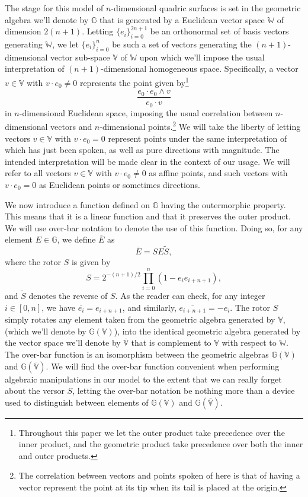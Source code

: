 \documentclass{birkjour}
\theoremstyle{definition}
\theoremstyle{remark}
\numberwithin{equation}{section}
\newcommand{\G}{\mathbb{G}}
\newcommand{\V}{\mathbb{V}}
\newcommand{\W}{\mathbb{W}}
\begin{document}
The stage for this model of $n$-dimensional quadric surfaces is set in the geometric
algebra we'll denote by $\G$ that is generated by a Euclidean vector space $\W$ of dimension
$2(n+1)$.  Letting $\{e_i\}_{i=0}^{2n+1}$ be an orthonormal set of basis vectors
generating $\W$, we let $\{e_i\}_{i=0}^n$ be such a set of vectors generating
the $(n+1)$-dimensional vector sub-space $\V$ of $\W$ upon which we'll impose the
usual interpretation of $(n+1)$-dimensional homogeneous space.  Specifically,
a vector $v\in\V$ with $v\cdot e_0\neq 0$ represents the point given by\footnote{Throughout this
paper we let the outer product take precedence over the inner product, and the geometric product
take precedence over both the inner and outer products.}
\begin{equation}
\frac{e_0\cdot e_0\wedge v}{e_0\cdot v}
\end{equation}
in $n$-dimensional Euclidean space, imposing the usual correlation between $n$-dimensional
vectors and $n$-dimensional points.\footnote{The correlation between
vectors and points spoken of here is that of having a vector represent the point
at its tip when its tail is placed at the origin.}  We will take the liberty of letting vectors $v\in\V$ with $v\cdot e_0=0$
represent points under the same interpretation of which has just been spoken, as
well as pure directions with magnitude.  The intended interpretation will be made clear
in the context of our usage.  We will refer to all vectors $v\in\V$ with $v\cdot e_0\neq 0$
as affine points, and such vectors with $v\cdot e_0=0$ as Euclidean points
or sometimes directions.

We now introduce a function defined on $\G$ having the outermorphic property.
This means that it is a linear function and that it preserves the outer product.  We will
use over-bar notation to denote the use of this function.  Doing so, for any
element $E\in\G$, we define $\overline{E}$ as
\begin{equation}
\overline{E} = SE\tilde{S},
\end{equation}
where the rotor $S$ is given by
\begin{equation}
S = 2^{-(n+1)/2}\prod_{i=0}^n\left(1-e_ie_{i+n+1}\right),
\end{equation}
and $\tilde{S}$ denotes the reverse of $S$.
As the reader can check, for any integer $i\in[0,n]$, we have $\overline{e_i}=e_{i+n+1}$,
and similarly, $\overline{e_{i+n+1}}=-e_i$.
The rotor $S$ simply rotates any element taken from the geometric algebra generated
by $\V$, (which we'll denote by $\G(\V)$), into the identical geometric
algebra generated by the vector
space we'll denote by $\overline{\V}$ that is complement to $\V$ with respect to $\W$.
The over-bar function is an isomorphism between the geometric algebras $\G(\V)$ and $\G(\overline{\V})$.
We will find the over-bar function convenient when performing algebraic manipulations in our model
to the extent that we can really forget about the versor $S$, letting the over-bar notation be nothing
more than a device used to distinguish between elements of $\G(\V)$ and $\G(\overline{\V})$.
\end{document}
